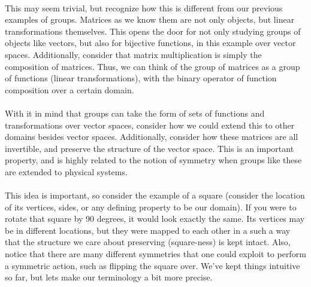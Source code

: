 \documentclass[twoside]{article}
\begin{document}
\begin{spacing}{1.25}
\paragraph*{} This may seem trivial, but recognize how this is different from our 
previous examples of groups. Matrices as we know them are not only objects, 
but linear transformations themselves. This opens the door for not only studying 
groups of objects like vectors, but also for bijective functions, in this example 
over vector spaces. Additionally, consider that matrix multiplication is simply 
the composition of matrices. Thus, we can think of the group of matrices as a
group of functions (linear transformations), with the binary operator of 
function composition over a certain domain. 

\paragraph*{} With it in mind that groups can take the form of sets of functions 
and transformations over vector spaces, consider how we could extend this to 
other domains besides vector spaces. Additionally, consider how these matrices 
are all invertible, and preserve the structure of the vector space. This is an 
important property, and is highly related to the notion of symmetry when 
groups like these are extended to physical systems. 

\paragraph*{} This idea is important, so consider the example of
a square (consider the location of its vertices, sides, or any defining property
to be our domain). If you were to rotate that square by 90 degrees, it would look exactly the 
same. Its vertices may be in different locations, but they were mapped to each other 
in a such a way that the structure we care about preserving (square-ness) is kept 
intact. Also, notice that there are many different symmetries that one could exploit 
to perform a symmetric action, such as flipping the square over. 
We've kept things intuitive so far, but lets make our terminology a bit more precise.


\end{spacing}
\end{document}
